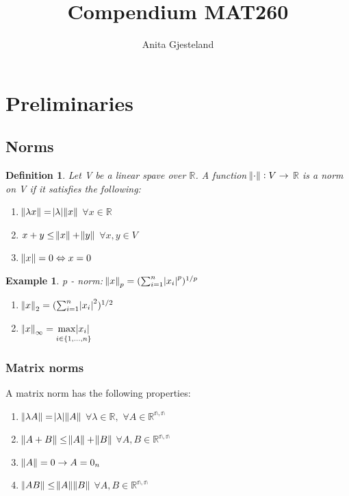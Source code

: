 \documentclass[a4paper, 12pt]{article}
\title{Compendium MAT260}
\author{Anita Gjesteland}
\begin{document}
\maketitle




\section{Preliminaries}
\subsection{Norms}

\newtheorem{mydef}{Definition}
\newtheorem{myex}{Example}
\newtheorem{mythm}{Theorem}
\begin{mydef}
	Let V be a linear spave over $\mathbb{R}$. A function $\norm{\cdot}: V \rightarrow$ $\mathbb{R}$ is a norm on V if it satisfies the following:\\
	\begin{enumerate}[label=(\roman*)]
		\item $\norm{\lambda x} = \abs{\lambda}\norm{x}$ \: $ \forall x \in \mathbb{R} $
		\item $\normalcolor{x + y} \leq \norm{x} + \norm{y}$ \:$ \forall x,y \in V$
		\item $\norm{x} = 0 \Leftrightarrow x = 0$
	\end{enumerate}
\end{mydef}

\begin{myex} 
	p - norm: $\norm{x}_p = (\sum_{i = 1}^{n}\abs{x_i}^p)^{1/p}$
	\begin{enumerate}
		\item[p = 2:] $\norm{x}_2 = (\sum_{i = 1}^{n}\abs{x_i}^2)^{1/2} $
		\item [p = $\infty$:] $\norm{x}_\infty = \underset{i \in \{1,...,n\}}{\max \abs{x_i}}$
	\end{enumerate}
\end{myex}

\subsubsection{Matrix norms}

A matrix norm has the following properties:
\begin{enumerate}[label=(\roman*)]
	\item $\norm{\lambda A} = \abs{\lambda}\norm{A} $\: $\forall \lambda \in \mathbb{R},$ \:$ \forall A \in \mathbb{R^{n,n}}$
	\item $\norm{A + B} \leq \norm{A} + \norm{B}$ \: $\forall A,B \in \mathbb{R^{n,n}}$
	\item $\norm{A} = 0 \rightarrow A = 0_n$
	\item $\norm{AB} \leq \norm{A}\norm{B}$ \: $\forall A,B \in \mathbb{R^{n,n}}$
\end{enumerate}
\end{document}
